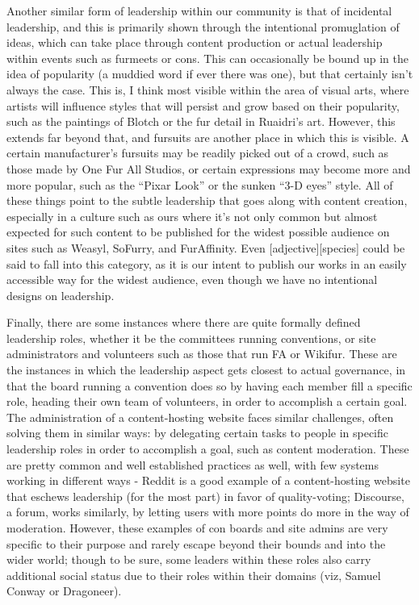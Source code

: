 Another similar form of leadership within our community is that of
incidental leadership, and this is primarily shown through the
intentional promuglation of ideas, which can take place through content
production or actual leadership within events such as furmeets or cons.
This can occasionally be bound up in the idea of popularity (a muddied
word if ever there was one), but that certainly isn't always the case.
This is, I think most visible within the area of visual arts, where
artists will influence styles that will persist and grow based on their
popularity, such as the paintings of Blotch or the fur detail in
Ruaidri's art. However, this extends far beyond that, and fursuits are
another place in which this is visible. A certain manufacturer's
fursuits may be readily picked out of a crowd, such as those made by One
Fur All Studios, or certain expressions may become more and more
popular, such as the ``Pixar Look'' or the sunken ``3-D eyes'' style.
All of these things point to the subtle leadership that goes along with
content creation, especially in a culture such as ours where it's not
only common but almost expected for such content to be published for the
widest possible audience on sites such as Weasyl, SoFurry, and
FurAffinity. Even {[}adjective{]}{[}species{]} could be said to fall
into this category, as it is our intent to publish our works in an
easily accessible way for the widest audience, even though we have no
intentional designs on leadership.

Finally, there are some instances where there are quite formally defined
leadership roles, whether it be the committees running conventions, or
site administrators and volunteers such as those that run FA or Wikifur.
These are the instances in which the leadership aspect gets closest to
actual governance, in that the board running a convention does so by
having each member fill a specific role, heading their own team of
volunteers, in order to accomplish a certain goal. The administration of
a content-hosting website faces similar challenges, often solving them
in similar ways: by delegating certain tasks to people in specific
leadership roles in order to accomplish a goal, such as content
moderation. These are pretty common and well established practices as
well, with few systems working in different ways - Reddit is a good
example of a content-hosting website that eschews leadership (for the
most part) in favor of quality-voting; Discourse, a forum, works
similarly, by letting users with more points do more in the way of
moderation. However, these examples of con boards and site admins are
very specific to their purpose and rarely escape beyond their bounds and
into the wider world; though to be sure, some leaders within these roles
also carry additional social status due to their roles within their
domains (viz, Samuel Conway or Dragoneer).

